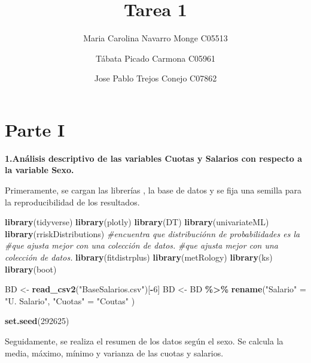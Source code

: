 \documentclass[
]{article}
\title{Tarea 1}
\author{Maria Carolina Navarro Monge C05513 \and Tábata Picado Carmona
C05961 \and Jose Pablo Trejos Conejo C07862}
\date{}
\newenvironment{Shaded}{\begin{snugshade}}{\end{snugshade}}
\newcommand{\CommentTok}[1]{\textcolor[rgb]{0.56,0.35,0.01}{\textit{#1}}}
\newcommand{\DecValTok}[1]{\textcolor[rgb]{0.00,0.00,0.81}{#1}}
\newcommand{\FunctionTok}[1]{\textcolor[rgb]{0.13,0.29,0.53}{\textbf{#1}}}
\newcommand{\NormalTok}[1]{#1}
\newcommand{\OtherTok}[1]{\textcolor[rgb]{0.56,0.35,0.01}{#1}}
\newcommand{\SpecialCharTok}[1]{\textcolor[rgb]{0.81,0.36,0.00}{\textbf{#1}}}
\newcommand{\StringTok}[1]{\textcolor[rgb]{0.31,0.60,0.02}{#1}}
\begin{document}
\maketitle

\hypertarget{parte-i}{%
\section{Parte I}\label{parte-i}}

\textbf{1.Análisis descriptivo de las variables Cuotas y Salarios con
respecto a la variable Sexo.}

Primeramente, se cargan las librerías , la base de datos y se fija una
semilla para la reproducibilidad de los resultados.

\begin{Shaded}
\begin{Highlighting}[]
\FunctionTok{library}\NormalTok{(tidyverse)}
\FunctionTok{library}\NormalTok{(plotly)}
\FunctionTok{library}\NormalTok{(DT)}
\FunctionTok{library}\NormalTok{(univariateML)}
\FunctionTok{library}\NormalTok{(rriskDistributions) }\CommentTok{\#encuentra que distribuciónn de probabilidades es la}
                            \CommentTok{\#que ajusta mejor con una colección de datos.}
                            \CommentTok{\#que ajusta mejor con una colección de datos.}
\FunctionTok{library}\NormalTok{(fitdistrplus)}
\FunctionTok{library}\NormalTok{(metRology)}
\FunctionTok{library}\NormalTok{(ks)}
\FunctionTok{library}\NormalTok{(boot)}

\NormalTok{BD }\OtherTok{\textless{}{-}} \FunctionTok{read\_csv2}\NormalTok{(}\StringTok{"BaseSalarios.csv"}\NormalTok{)[}\SpecialCharTok{{-}}\DecValTok{6}\NormalTok{]}
\NormalTok{BD }\OtherTok{\textless{}{-}}\NormalTok{ BD }\SpecialCharTok{\%\textgreater{}\%} \FunctionTok{rename}\NormalTok{(}\StringTok{"Salario"} \OtherTok{=} \StringTok{"U. Salario"}\NormalTok{, }\StringTok{"Cuotas"} \OtherTok{=} \StringTok{"Coutas"}\NormalTok{ )}

\FunctionTok{set.seed}\NormalTok{(}\DecValTok{292625}\NormalTok{)}
\end{Highlighting}
\end{Shaded}

Seguidamente, se realiza el resumen de los datos según el sexo. Se
calcula la media, máximo, mínimo y varianza de las cuotas y salarios.
\end{document}
